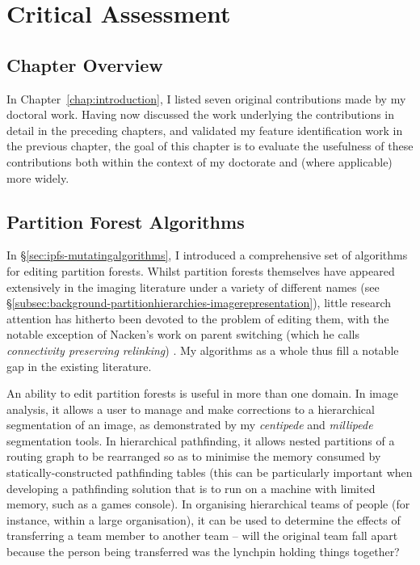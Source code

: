 \chapter{Critical Assessment}
\label{chap:assessment}

\section{Chapter Overview}

In Chapter~\ref{chap:introduction}, I listed seven original contributions made by my doctoral work. Having now discussed the work underlying the contributions in detail in the preceding chapters, and validated my feature identification work in the previous chapter, the goal of this chapter is to evaluate the usefulness of these contributions both within the context of my doctorate and (where applicable) more widely.

\section{Partition Forest Algorithms}

In \S\ref{sec:ipfs-mutatingalgorithms}, I introduced a comprehensive set of algorithms for editing partition forests. Whilst partition forests themselves have appeared extensively in the imaging literature under a variety of different names (see \S\ref{subsec:background-partitionhierarchies-imagerepresentation}), little research attention has hitherto been devoted to the problem of editing them, with the notable exception of Nacken's work on parent switching (which he calls \emph{connectivity preserving relinking}) \cite{nacken95}. My algorithms as a whole thus fill a notable gap in the existing literature.

An ability to edit partition forests is useful in more than one domain. In image analysis, it allows a user to manage and make corrections to a hierarchical segmentation of an image, as demonstrated by my \emph{centipede} and \emph{millipede} segmentation tools. In hierarchical pathfinding, it allows nested partitions of a routing graph to be rearranged so as to minimise the memory consumed by statically-constructed pathfinding tables (this can be particularly important when developing a pathfinding solution that is to run on a machine with limited memory, such as a games console). In organising hierarchical teams of people (for instance, within a large organisation), it can be used to determine the effects of transferring a team member to another team -- will the original team fall apart because the person being transferred was the lynchpin holding things together?

